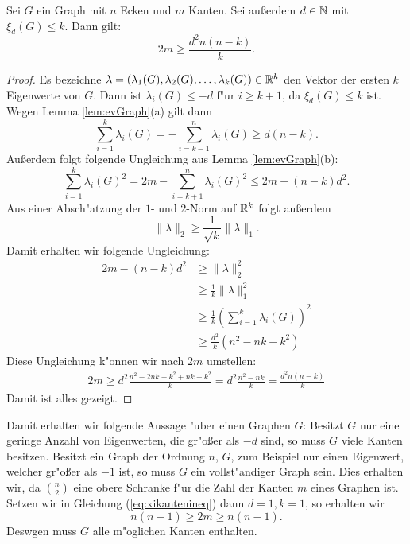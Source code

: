 \begin{theorem}
  Sei $G$ ein Graph mit $n$ Ecken und $m$ Kanten. Sei au{\ss}erdem $d\in {\mathbb{N}}$ mit $\xi_d(G) \leq k$. Dann gilt:
  $$ 2m \geq \frac{d^{2}n(n-k)}{k}.$$
  \label{thm:xikantenschranke}
\end{theorem}

\begin{proof}
  Es bezeichne $\lambda = (\lambda_{1}(G),\lambda_{2}(G), \dots , \lambda_{k}(G))\in {\mathbb{R}}^{k}$ den Vektor der ersten $k$ Eigenwerte von $G$. Dann ist $\lambda_{i}(G) \leq -d$ f"ur $i \geq k+1$, da $\xi_{d}(G) \leq k$ ist.
  Wegen Lemma \ref{lem:evGraph}(a) gilt dann 
  $$
  \sum\limits_{i=1}^{k} \lambda_{i}(G) = - \sum\limits_{i=k-1}^{n} \lambda_{i}(G) \geq d(n-k).
  $$
  Au{\ss}erdem folgt folgende Ungleichung aus Lemma \ref{lem:evGraph}(b):
  $$ \sum\limits_{i=1}^{k} \lambda_{i}(G)^{2} = 2m - \sum\limits_{i=k+1}^{n} \lambda_{i}(G) ^{2} \leq 2m - (n-k)d^{2}.$$
  Aus einer Absch"atzung der $1$- und $2$-Norm auf ${\mathbb{R}}^{k}$ folgt au{\ss}erdem 
  $$\| \lambda \|_{2} \geq \frac{1}{\sqrt{k}} \|\lambda\|_{1}.$$
  Damit erhalten wir folgende Ungleichung:
  \begin{align*}
    2m - (n-k)d^{2} &\geq \| \lambda \| _{2}^{2} \\
    & \geq \frac{1}{k} \| \lambda \| _1^{2} \\
    & \geq \frac{1}{k} ( \sum\limits_{i=1}^{k} \lambda_{i}(G))^{2} \\
    & \geq \frac{d^{2}}{k}(n^{2}-nk+k^{2})
  \end{align*}
  Diese Ungleichung k"onnen wir nach $2m$ umstellen:
  \begin{align}
    2m \geq d^{2}\frac{n^{2}-2nk + k^{2}+ nk - k^{2} }{k} = d^{2}\frac{n^{2}-nk}{k} = \frac{d^{2}n(n-k)}{k}
    \label{eq:xikantenineq}
  \end{align}
  Damit ist alles gezeigt. 
\end{proof}
Damit erhalten wir folgende Aussage "uber einen Graphen $G$: Besitzt $G$ nur eine geringe Anzahl von Eigenwerten, die gr"o{\ss}er als $-d$ sind, so muss $G$ viele Kanten besitzen. Besitzt ein Graph der Ordnung $n$, $G$, zum Beispiel nur einen Eigenwert, welcher gr"o{\ss}er als $-1$ ist, so muss $G$ ein vollst"andiger Graph sein. 
Dies erhalten wir, da $\binom{n}{2}$ eine obere Schranke f"ur die Zahl der Kanten $m$ eines Graphen ist. Setzen wir in Gleichung (\ref{eq:xikantenineq}) dann $d=1, k=1$, so erhalten wir 
\begin{equation*}
  n(n-1) \geq 2m \geq n(n-1).
\end{equation*}
Deswgen muss  $G$ alle m"oglichen Kanten enthalten.
